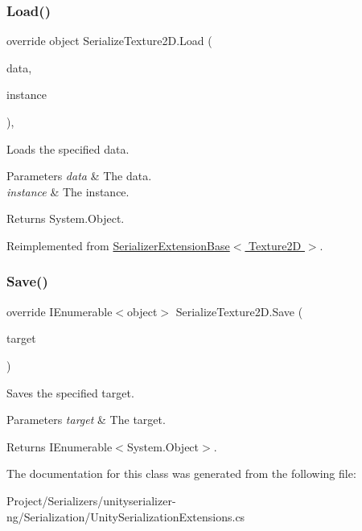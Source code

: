 \subsubsection{\texorpdfstring{Load()}{Load()}}
{\footnotesize\ttfamily override object Serialize\+Texture2\+D.\+Load (\begin{DoxyParamCaption}\item[{object \mbox{[}$\,$\mbox{]}}]{data,  }\item[{object}]{instance }\end{DoxyParamCaption})\hspace{0.3cm}{\ttfamily [inline]}, {\ttfamily [virtual]}}



Loads the specified data. 


\begin{DoxyParams}{Parameters}
{\em data} & The data.\\
\hline
{\em instance} & The instance.\\
\hline
\end{DoxyParams}
\begin{DoxyReturn}{Returns}
System.\+Object.
\end{DoxyReturn}


Reimplemented from \hyperlink{class_serializer_extension_base_a3792a9b27056e30ca0ac91531936ae47}{Serializer\+Extension\+Base$<$ Texture2\+D $>$}.

\mbox{\label{class_serialize_texture2_d_aa2fd3c70876658476e1411bb13ac5966}} 
\subsubsection{\texorpdfstring{Save()}{Save()}}
{\footnotesize\ttfamily override I\+Enumerable$<$object$>$ Serialize\+Texture2\+D.\+Save (\begin{DoxyParamCaption}\item[{Texture2D}]{target }\end{DoxyParamCaption})\hspace{0.3cm}{\ttfamily [inline]}}



Saves the specified target. 


\begin{DoxyParams}{Parameters}
{\em target} & The target.\\
\hline
\end{DoxyParams}
\begin{DoxyReturn}{Returns}
I\+Enumerable$<$System.\+Object$>$.
\end{DoxyReturn}


The documentation for this class was generated from the following file\+:\begin{DoxyCompactItemize}
\item 
Project/\+Serializers/unityserializer-\/ng/\+Serialization/Unity\+Serialization\+Extensions.\+cs\end{DoxyCompactItemize}
